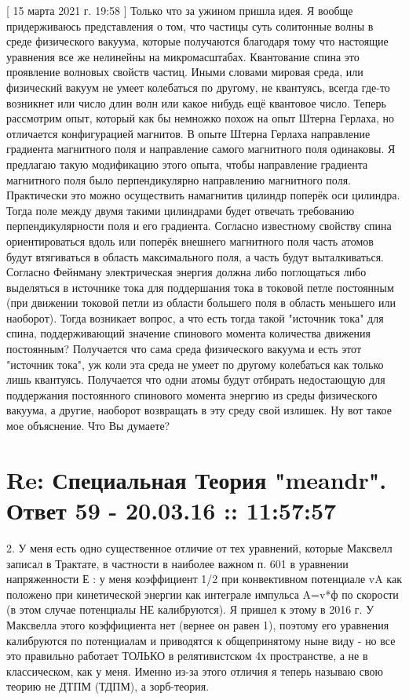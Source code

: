 \documentclass{article}
\begin{document}
[ 15 марта 2021 г. 19:58 ] Только что за ужином пришла идея. Я вообще придерживаюсь представления о том, что частицы суть солитонные волны в среде физического вакуума, которые получаются благодаря тому что настоящие уравнения все же нелинейны на микромасштабах. Квантование спина это проявление волновых свойств частиц. Иными словами мировая среда, или физический вакуум не умеет колебаться по другому, не квантуясь, всегда где-то возникнет или число длин волн или какое нибудь ещё квантовое число. Теперь рассмотрим опыт, который как бы немножко похож на опыт Штерна Герлаха, но отличается конфигурацией магнитов. В опыте Штерна Герлаха направление градиента магнитного поля и направление самого магнитного поля одинаковы. Я предлагаю такую модификацию этого опыта, чтобы направление градиента магнитного поля было перпендикулярно направлению магнитного поля. Практически это можно осуществить намагнитив цилиндр поперёк оси цилиндра. Тогда поле между двумя такими цилиндрами будет отвечать требованию перпендикулярности поля и его градиента. Согласно известному свойству спина ориентироваться вдоль или поперёк внешнего магнитного поля часть атомов будут втягиваться в область максимального поля, а часть будут выталкиваться. Согласно Фейнману электрическая энергия должна либо поглощаться либо выделяться в источнике тока для поддершания тока в токовой петле постоянным (при движении токовой петли из области большего поля в область меньшего или наоборот). Тогда возникает вопрос, а что есть тогда такой "источник тока" для спина, поддерживающий значение спинового момента количества движения постоянным? Получается что сама среда физического вакуума и есть этот "источник тока", уж коли эта среда не умеет по другому колебаться как только лишь квантуясь. Получается что одни атомы будут отбирать недостающую для поддержания постоянного спинового момента энергию из среды физического вакуума, а другие, наоборот возвращать в эту среду свой излишек. Ну вот такое мое объяснение. Что Вы думаете?



\section{Re: Специальная Теория "meandr". Ответ 59 - 20.03.16 :: 11:57:57}

2. У меня есть одно существенное отличие от тех уравнений, которые Максвелл записал в Трактате, в частности  в наиболее важном п. 601 в уравнении напряженности Е :
у меня коэффициент 1/2 при конвективном потенциале vA как положено при кинетической энергии как интеграле импульса A=v*ф по скорости (в этом случае потенциалы НЕ калибруются). Я пришел к этому в 2016 г.
У Максвелла этого коэффициента нет (вернее он равен 1), поэтому его уравнения калибруются по потенциалам и приводятся к общепринятому ныне виду - но все это правильно работает ТОЛЬКО в релятивистском 4х пространстве, а не в классическом, как у меня.
Именно из-за этого отличия я теперь называю свою теорию не ДТПМ (ТДПМ), а зорб-теория.
\end{document}
